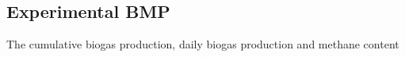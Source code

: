 \subsection{Experimental BMP}
The cumulative biogas production, daily biogas production and methane content